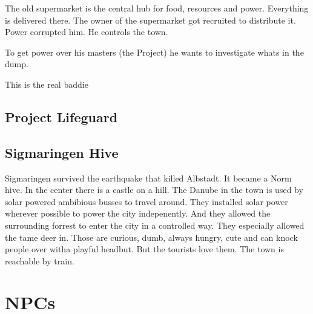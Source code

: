 \begin{npcBox}[title=Name]
    \begin{consequences}
    \item {}
    \item {}
    \item {}
    \end{consequences}
    
    \begin{npcDescription}
    The old supermarket is the central hub for food, resources and power. Everything is delivered there. The owner of the supermarket got recruited to distribute it. Power corrupted him. He controls the town.

    To get power over his masters (the Project) he wants to investigate whats in the dump.
    
    This is the real baddie
    \end{npcDescription}
    
\end{npcBox}




\subsection{Project Lifeguard}


\subsection{Sigmaringen Hive}

Sigmaringen survived the earthquake that killed Albstadt. It became a Norm hive. In the center there is a castle on a hill. The Danube in the town is used by solar powered ambibious busses to travel around. They installed solar power wherever possible to power the city indepenently. And they allowed the surrounding forrest to enter the city in a controlled way. They especially allowed the tame deer in. Those are curious, dumb, always hungry, cute and can knock people over witha  playful headbut. But the tourists love them.
The town is reachable by train.


\section{NPCs}

